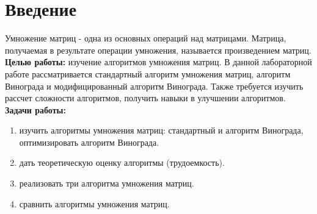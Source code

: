 \chapter*{Введение}


Умножение матриц - одна из основных операций над матрицами.
Матрица, получаемая в результате операции умножения, называется
произведением матриц.\\


\textbf{Целью работы:} изучение алгоритмов умножения матриц. В данной
лабораторной работе рассматривается стандартный алгоритм умножения
матриц, алгоритм Винограда и модифицированный алгоритм Винограда.
Также требуется изучить рассчет сложности алгоритмов, получить навыки
в улучшении алгоритмов.
\\

\textbf{Задачи работы:}

\begin{enumerate}
    \setlength{\itemsep}{0em}
    \item изучить алгоритмы умножения матриц: стандартный и алгоритм Винограда,
    оптимизировать алгоритм Винограда.
    \item дать теоретическую оценку алгоритмы (трудоемкость).
    \item реализовать три алгоритма умножения матриц.
    \item сравнить алгоритмы умножения матриц.
\end{enumerate}
